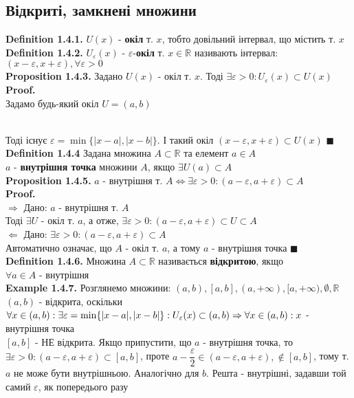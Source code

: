 \documentclass[a4paper, 14pt]{extarticle}
\def\bigline{\vspace{5mm}\\}
\def\defin#1{\textbf{Definition {#1}}}
\def\ex#1{\textbf{Example {#1}}}
\def\prp#1{\textbf{Proposition {#1}}}
\def\proof{\textbf{Proof.}\\}
\def\bigline{\vspace{5mm}\\}
\def\qed{$\blacksquare$}
\begin{document}
	\subsection{Відкриті, замкнені множини}
	\defin{1.4.1.} $U(x)$ - \textbf{окіл} т. $x$, тобто довільний інтервал, що містить т. $x$
\bigline
\defin{1.4.2.} $U_{\varepsilon}(x)$ - $\varepsilon$-\textbf{окіл} т. $x \in \mathbb{R}$ називають інтервал:\\
$(x-\varepsilon,x+\varepsilon), \forall \varepsilon > 0$
\bigline
\prp{1.4.3.} Задано $U(x)$ - окіл т. $x$. Тоді $\exists \varepsilon > 0: U_{\varepsilon}(x) \subset U(x)$\\
\proof
Задамо будь-який окіл $U = (a,b)$\\
\\
Тоді існує $\varepsilon = \min \{|x-a|,|x-b|\}$. І такий окіл $(x-\varepsilon,x+\varepsilon) \subset U(x)$ \qed
\bigline
\defin{1.4.4} Задана множина $A \subset \mathbb{R}$ та елемент $a \in A$\\
$a$ - \textbf{внутрішня точка} множини $A$, якщо $\exists U(a) \subset A$
\bigline
\prp{1.4.5.} $a$ - внутрішня т. $A \iff \exists \varepsilon > 0: (a-\varepsilon,a+\varepsilon) \subset A$\\
\proof
$\boxed{\Rightarrow}$ Дано: $a$ - внутрішня т. $A$\\
Тоді $\exists U$ - окіл т. $a$, а отже, $\exists \varepsilon > 0: (a-\varepsilon,a+\varepsilon) \subset U \subset A$
\bigline
$\boxed{\Leftarrow}$ Дано: $\exists \varepsilon > 0: (a-\varepsilon,a+\varepsilon) \subset A$\\
Автоматично означає, що $A$ - окіл т. $a$, а тому $a$ - внутрішня точка \qed
\bigline
\defin{1.4.6.} Множина $A \subset \mathbb{R}$ називається \textbf{відкритою}, якщо \\ $\forall a \in A$ - внутрішня
\bigline
\ex{1.4.7.} Розглянемо множини: $(a,b), [a,b], (a,+\infty), [a,+\infty), \emptyset, \mathbb{R}$\\
$(a,b)$ - відкрита, оскільки $\forall x \in (a,b): \exists \varepsilon = \min\{|x-a|,|x-b|\}: \\ U_{\varepsilon}(x) \subset (a,b) \Rightarrow \forall x \in (a,b): x$ - внутрішня точка
\bigline
$[a,b]$ - НЕ відкрита. Якщо припустити, що $a$ - внутрішня точка, то $\exists \varepsilon > 0: (a-\varepsilon, a+\varepsilon) \subset [a,b]$, проте $a-\dfrac{\varepsilon}{2} \in (a - \varepsilon, a + \varepsilon), \not \in [a,b]$, тому т. $a$ не може бути внутрішньою. Аналогічно для $b$. Решта - внутрішні, задавши той самий $\varepsilon$, як попередього разу
\end{document}

